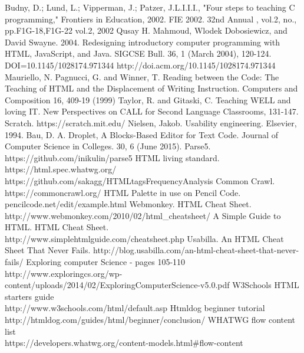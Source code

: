 \documentclass[conference]{IEEEtran}
\begin{document}
\begin{thebibliography}{1}

  Budny, D.; Lund, L.; Vipperman, J.; Patzer, J.L.I.I.I., "Four steps to teaching C programming," Frontiers in Education, 2002. FIE 2002. 32nd Annual , vol.2, no., pp.F1G-18,F1G-22 vol.2, 2002
  Qusay H. Mahmoud, Wlodek Dobosiewicz, and David Swayne. 2004. Redesigning introductory computer programming with HTML, JavaScript, and Java. SIGCSE Bull. 36, 1 (March 2004), 120-124. DOI=10.1145/1028174.971344 http://doi.acm.org/10.1145/1028174.971344
  Mauriello, N. Pagnucci, G. and Winner, T. Reading between the Code: The Teaching of HTML and the Displacement of Writing Instruction. Computers and Composition 16, 409-19 (1999)
  Taylor, R. and Gitaski, C. Teaching WELL and loving IT. New Perspectives on CALL for Second Language Classrooms, 131-147.
  Scratch. https://scratch.mit.edu/
  Nielsen, Jakob. Usability engineering. Elsevier, 1994.
  Bau, D. A. Droplet, A Blocks-Based Editor for Text Code. Journal of Computer Science in Colleges. 30, 6 (June 2015).
  Parse5. https://github.com/inikulin/parse5
  HTML living standard. https://html.spec.whatwg.org/
  https://github.com/sakagg/HTMLtagsFrequencyAnalysis
  Common Crawl. https://commoncrawl.org/
  HTML Palette in use on Pencil Code. pencilcode.net/edit/example.html
  Webmonkey. HTML Cheat Sheet.\\ http://www.webmonkey.com/2010/02/html\_cheatsheet/
  A Simple Guide to HTML. HTML Cheat Sheet.\\ http://www.simplehtmlguide.com/cheatsheet.php
  Usabilla. An HTML Cheat Sheet That Never Fails. http://blog.usabilla.com/an-html-cheat-sheet-that-never-fails/
  Exploring computer Science - pages 105-110\\
  http://www.exploringcs.org/wp-content/uploads/2014/02/ExploringComputerScience-v5.0.pdf
  W3Schools HTML starters guide\\
  http://www.w3schools.com/html/default.asp
  Htmldog beginner tutorial http://htmldog.com/guides/html/beginner/conclusion/
  WHATWG flow content list\\
  https://developers.whatwg.org/content-models.html\#flow-content

\end{thebibliography}
\end{document}

